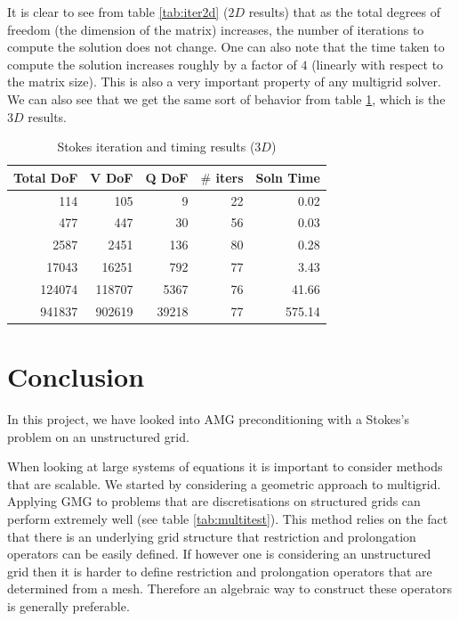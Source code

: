\documentclass[11pt]{article}
\numberwithin{equation}{section}    %
\begin{document}
\noindent It is clear to see from table \ref{tab:iter2d} ($2D$ results) that as the total degrees of freedom (the dimension of the matrix) increases, the number of iterations to compute the solution does not change. One can also note that the time taken to compute the solution increases roughly by a factor of $4$ (linearly with respect to the matrix size). This is also a very important property of any multigrid solver. We can also see that we get the same sort of behavior from  table \ref{tab:iter3d}, which is the $3D$ results.

\begin{table}
\centering
\begin{tabular}{rrrrr}
\hline
 Total DoF &   V DoF &  Q DoF &  $\#$ iters &  Soln Time  \\
\hline
     114    &     105 &      9 &       22 &       0.02                  \\
     477    &     447 &     30 &       56 &       0.03             \\
    2587    &    2451 &    136 &       80 &       0.28             \\
   17043   &   16251 &    792 &       77 &       3.43           \\
  124074  &  118707 &   5367 &       76 &      41.66        \\
941837 &  902619 &  39218 &       77 &     575.14  \\


\hline
\end{tabular}
\caption{Stokes iteration and timing results ($3D$)}
\label{tab:iter3d}
\end{table}

\section{Conclusion}
In this project, we have looked into AMG preconditioning with a Stokes's problem on an unstructured grid.

When looking at large systems of equations it is important to consider methods that are scalable. We started by considering a geometric approach to multigrid. Applying GMG to problems that are discretisations on structured grids can perform extremely well (see table \ref{tab:multitest}). This method relies on the fact that there is an underlying grid structure that restriction and prolongation operators can be easily defined. If however one is considering an unstructured grid then it is harder to define restriction and prolongation operators that are determined from a mesh. Therefore an algebraic way to construct these operators is generally preferable.
\end{document}
